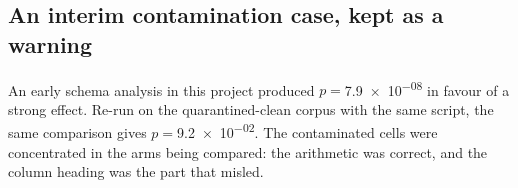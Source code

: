 \subsection{An interim contamination case, kept as a warning}

An early schema analysis in this project produced $p={}$\num{7.9e-08} in
favour of a strong effect. Re-run on the quarantined-clean corpus with the
same script, the same comparison gives $p={}$\num{9.2e-02}\live. The
contaminated cells were concentrated in the arms being compared: the
arithmetic was correct, and the column heading was the part that misled.
